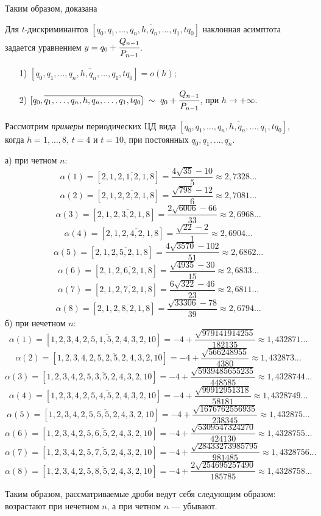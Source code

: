 Таким образом, доказана
\begin{theoremr}\label{PiskunovaTretyakov:th:3}
Для $t$-дискриминантов $[{q_0},\overline{{q_1},\dots,{q_n},{h},{q_n},\dots,{q_1},t{q_0}}]$ наклонная асимптота задается уравнением $y={q_0}+\cfrac {Q_{n-1}}{P_{n-1}}$.
\end{theoremr}

\begin{corollaryr}
\begin{enumerate}
\item[1) ]$[{q_0},\overline{{q_1},\dots,{q_n},{h},{q_n},\dots,{q_1},t{q_0}}]=o(h)$;
\item[2) ]$[{q_0},\overline{{q_1},\dots,{q_n},{h},{q_n},\dots,{q_1},t{q_0}}] \ \sim \ {{q_0}+\cfrac {Q_{n-1}}{P_{n-1}}}$, при ${h\to +\infty}$.
\end{enumerate}
\end{corollaryr}


Рассмотрим \emph{примеры} периодических ЦД вида $[{q_0},\overline{{q_1},\dots,{q_n},{h},{q_n},\dots,{q_1},{t{q_0}}}]$,
\newline когда $h=1,\dots,8$, $t=4$ и $t=10$, при постоянных ${q_0},{q_1},\dots,{q_n}.$

\begin{exampler}
а) при четном $n$:
\[\alpha(1)=[2,\overline{1,2,1,2,1,8}]=\frac {4\sqrt{35}-10}{5}\approx 2,7328\dots\]
\[\alpha(2)=[2,\overline{1,2,2,2,1,8}]=\frac {\sqrt{798}-12}{6}\approx 2,7081\dots\]
\[\alpha(3)=[2,\overline{1,2,3,2,1,8}]=\frac {2\sqrt{6006}-66}{33}\approx 2,6968\dots\]
\[\alpha(4)=[2,\overline{1,2,4,2,1,8}]=\frac {\sqrt{22}-2}{1}\approx 2,6904\dots\]
\[\alpha(5)=[2,\overline{1,2,5,2,1,8}]=\frac {4\sqrt{3570}-102}{51}\approx 2,6862\dots\]
\[\alpha(6)=[2,\overline{1,2,6,2,1,8}]=\frac {\sqrt{4935}-30}{15}\approx 2,6833\dots\]
\[\alpha(7)=[2,\overline{1,2,7,2,1,8}]=\frac {6\sqrt{322}-46}{23}\approx 2,6811\dots\]
\[\alpha(8)=[2,\overline{1,2,8,2,1,8}]=\frac {\sqrt{33306}-78}{39}\approx 2,6794\dots\]
б) при нечетном $n$:
\[\alpha(1)=[1,\overline{2,3,4,2,5,1,5,2,4,3,2,10}]=-4+\frac {\sqrt{979141914255}}{182135}\approx 1,432871\dots\]
\[\alpha(2)=[1,\overline{2,3,4,2,5,2,5,2,4,3,2,10}]=-4+\frac {\sqrt{566248955}}{4380}\approx 1,432873\dots\]
\[\alpha(3)=[1,\overline{2,3,4,2,5,3,5,2,4,3,2,10}]=-4+\frac {\sqrt{5939485655235}}{448585}\approx 1,4328744\dots\]
\[\alpha(4)=[1,\overline{2,3,4,2,5,4,5,2,4,3,2,10}]=-4+\frac {\sqrt{99912951318}}{58181}\approx 1,4328749\dots\]
\[\alpha(5)=[1,\overline{2,3,4,2,5,5,5,2,4,3,2,10}]=-4+\frac {\sqrt{1676762556935}}{238345}\approx 1,432875\dots\]
\[\alpha(6)=[1,\overline{2,3,4,2,5,6,5,2,4,3,2,10}]=-4+\frac {\sqrt{5309547324270}}{424130}\approx 1,4328755\dots\]
\[\alpha(7)=[1,\overline{2,3,4,2,5,7,5,2,4,3,2,10}]=-4+\frac {\sqrt{28433273985795}}{981485}\approx 1,4328756\dots\]
\[\alpha(8)=[1,\overline{2,3,4,2,5,8,5,2,4,3,2,10}]=-4+\frac {2\sqrt{254695257490}}{185785}\approx 1,4328758\dots\]
\end{exampler}
Таким образом, рассматриваемые дроби ведут себя следующим образом: возрастают при нечетном $n$, а при четном $n$ --- убывают.

